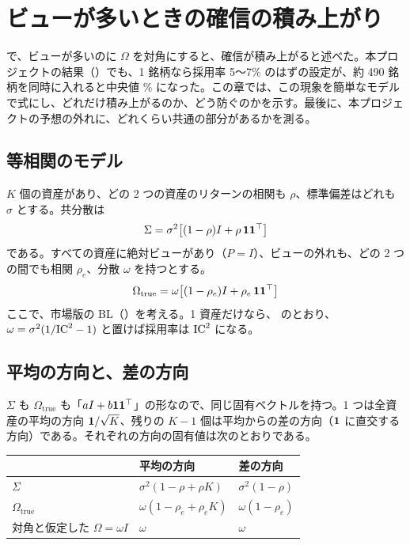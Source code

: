 \chapter{ビューが多いときの確信の積み上がり}\label{ch:stacking}

 で、ビューが多いのに $\Omega$ を対角にすると、確信が積み上がると述べた。本プロジェクトの結果（）でも、1 銘柄なら採用率 5〜7\% のはずの設定が、約 490 銘柄を同時に入れると中央値 \% になった。この章では、この現象を簡単なモデルで式にし、どれだけ積み上がるのか、どう防ぐのかを示す。最後に、本プロジェクトの予想の外れに、どれくらい共通の部分があるかを測る。

\section{等相関のモデル}

$K$ 個の資産があり、どの 2 つの資産のリターンの相関も $\rho$、標準偏差はどれも $\sigma$ とする。共分散は
\begin{equation}
\Sigma=\sigma^2\bigl[(1-\rho)I+\rho\,\mathbf{1}\mathbf{1}^{\top}\bigr]
\end{equation}
である。すべての資産に絶対ビューがあり（$P=I$）、ビューの外れも、どの 2 つの間でも相関 $\rho_e$、分散 $\omega$ を持つとする。
\begin{equation}
\Omega_{\mathrm{true}}=\omega\bigl[(1-\rho_e)I+\rho_e\,\mathbf{1}\mathbf{1}^{\top}\bigr]
\end{equation}
ここで、市場版の BL（）を考える。1 資産だけなら、 のとおり、$\omega=\sigma^2(1/\mathrm{IC}^2-1)$ と置けば採用率は $\mathrm{IC}^2$ になる。

\section{平均の方向と、差の方向}

$\Sigma$ も $\Omega_{\mathrm{true}}$ も「$aI+b\mathbf{1}\mathbf{1}^{\top}$」の形なので、同じ固有ベクトルを持つ。1 つは全資産の平均の方向 $\mathbf{1}/\sqrt K$、残りの $K-1$ 個は平均からの差の方向（$\mathbf{1}$ に直交する方向）である。それぞれの方向の固有値は次のとおりである。

\begin{center}
\small
\begin{tabular}{lll}
\toprule
 & 平均の方向 & 差の方向 \\
\midrule
$\Sigma$ & $\sigma^2(1-\rho+\rho K)$ & $\sigma^2(1-\rho)$ \\
$\Omega_{\mathrm{true}}$ & $\omega(1-\rho_e+\rho_eK)$ & $\omega(1-\rho_e)$ \\
対角と仮定した $\Omega=\omega I$ & $\omega$ & $\omega$ \\
\bottomrule
\end{tabular}
\end{center}

